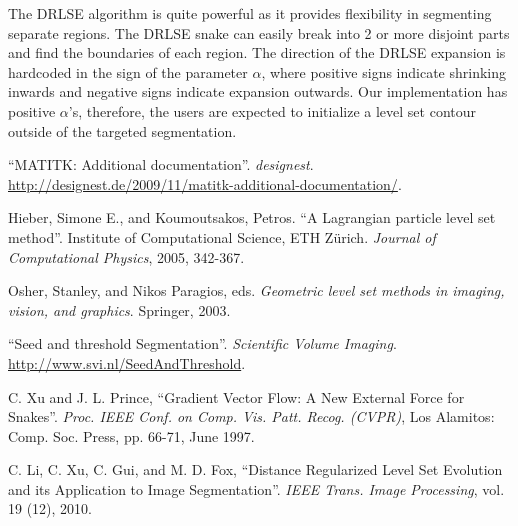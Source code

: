 \documentclass{article}
\begin{document}
The DRLSE algorithm is quite powerful as it provides flexibility in segmenting separate regions. The DRLSE snake can easily break into 2 or more disjoint parts and find the boundaries of each region. The direction of the DRLSE expansion is hardcoded in the sign of the parameter $\alpha$, where positive signs indicate shrinking inwards and negative signs indicate expansion outwards. Our implementation has positive $\alpha$'s, therefore, the users are expected to initialize a level set contour outside of the targeted segmentation.



\clearpage
\begin{thebibliography}{9}
\fontsize{10pt}{12pt}\selectfont
\raggedright

        ``MATITK: Additional documentation''.
        \emph{designest}.
        \url{http://designest.de/2009/11/matitk-additional-documentation/}.

        Hieber, Simone E., and Koumoutsakos, Petros.
        ``A Lagrangian particle level set method''.
        Institute of Computational Science, ETH Zürich.
        \emph{Journal of Computational Physics}, 2005, 342-367.

        Osher, Stanley, and Nikos Paragios, eds. 
        \emph{Geometric level set methods in imaging, vision, and graphics}.
        Springer, 2003.

        ``Seed and threshold Segmentation''.
        \emph{Scientific Volume Imaging}.
        \url{http://www.svi.nl/SeedAndThreshold}.

        C. Xu and J. L. Prince, ``Gradient Vector Flow: A New External Force for Snakes''.
        \emph{Proc. IEEE Conf. on Comp. Vis. Patt. Recog. (CVPR)}, 
        Los Alamitos: Comp. Soc. Press, pp. 66-71, June 1997.

        C. Li, C. Xu, C. Gui, and M. D. Fox, 
        ``Distance Regularized Level Set Evolution and its Application to Image Segmentation''.
        \emph{IEEE Trans. Image Processing}, 
        vol. 19 (12), 2010.
        
        
\end{thebibliography}


\end{document}
